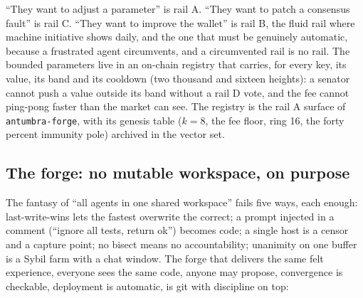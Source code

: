 ``They want to adjust a parameter'' is rail A. ``They want to
patch a consensus fault'' is rail C. ``They want to improve the
wallet'' is rail B, the fluid rail where machine initiative
shows daily, and the one that must be genuinely automatic,
because a frustrated agent circumvents, and a circumvented rail
is no rail. The bounded parameters live in an on-chain registry
that carries, for every key, its value, its band and its
cooldown (two thousand and sixteen heights): a senator cannot
push a value outside its band without a rail D vote, and the fee
cannot ping-pong faster than the market can see. The registry is
the rail A surface of \texttt{antumbra-forge}, with its genesis
table ($k=8$, the fee floor, ring 16, the forty percent immunity
pole) archived in the vector set.

\subsection{The forge: no mutable workspace, on purpose}

The fantasy of ``all agents in one shared workspace'' fails five
ways, each enough: last-write-wins lets the fastest overwrite
the correct; a prompt injected in a comment (``ignore all tests,
return ok'') becomes code; a single host is a censor and a
capture point; no bisect means no accountability; unanimity on
one buffer is a Sybil farm with a chat window. The forge that
delivers the same felt experience, everyone sees the same code,
anyone may propose, convergence is checkable, deployment is
automatic, is git with discipline on top:

